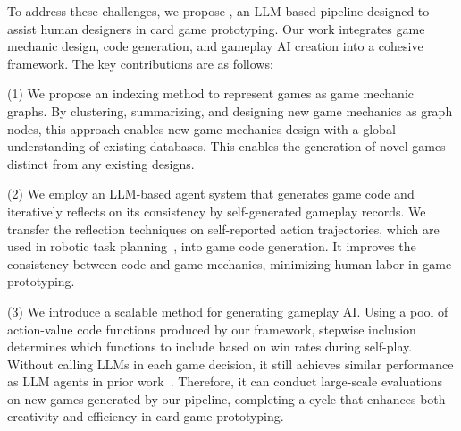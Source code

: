 To address these challenges, we propose \ourwork, an LLM-based pipeline designed to assist human designers in card game prototyping. Our work integrates game mechanic design, code generation, and gameplay AI creation into a cohesive framework. The key contributions are as follows:


(1) We propose an indexing method to represent games as game mechanic graphs. By clustering, summarizing, and designing new game mechanics as graph nodes, this approach enables new game mechanics design with a global understanding of existing databases. This enables the generation of novel games distinct from any existing designs.

(2) We employ an LLM-based agent system that generates game code and iteratively reflects on its consistency by self-generated gameplay records. We transfer the reflection techniques on self-reported action trajectories, which are used in robotic task planning~\cite{innermonologue}, into game code generation. It improves the consistency between code and game mechanics, minimizing human labor in game prototyping.

(3) We introduce a scalable method for generating gameplay AI. Using a pool of action-value code functions produced by our framework, stepwise inclusion determines which functions to include based on win rates during self-play. Without calling LLMs in each game decision, it still achieves similar performance as LLM agents in prior work~\cite{yao_react_2023,shinn_reflexion_2023}. Therefore, it can conduct large-scale evaluations on new games generated by our pipeline, completing a cycle that enhances both creativity and efficiency in card game prototyping.
